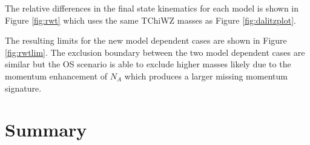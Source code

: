 
The relative differences in the final state kinematics for each model is shown in Figure \ref{fig:rwt} which uses the same TChiWZ masses as Figure \ref{fig:dalitzplot}.


The resulting limits for the new model dependent cases are shown in Figure \ref{fig:rwtlim}. The exclusion boundary between the two model dependent cases are similar but the OS scenario is able to exclude higher masses likely due to the momentum enhancement of $N_A$ which produces a larger missing momentum signature.


\section{Summary}
